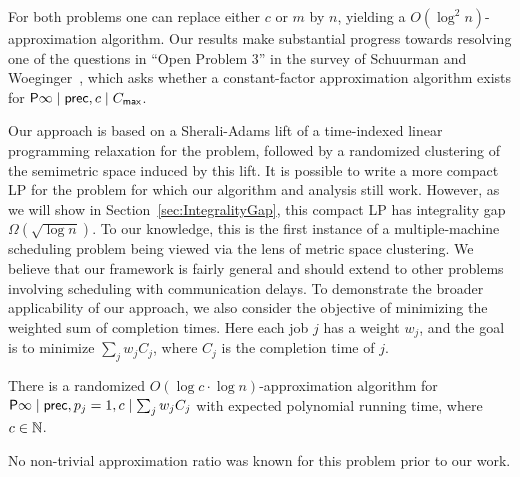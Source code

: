 For both problems one can replace either $c$ or $m$ by $n$, yielding a $O(\log^2 n)$-approximation algorithm.
Our results make substantial progress towards resolving  one of the questions in ``Open Problem 3'' in the survey of Schuurman and Woeginger~\cite{SW99a}, which asks whether a constant-factor approximation algorithm exists for $\mathsf{P} \infty \mid \mathsf{prec}, c \mid C_{\mathsf{max}}$.

Our approach is based on a Sherali-Adams lift of a time-indexed linear programming relaxation for the problem, followed by a randomized clustering of the semimetric space induced by this lift.
It is possible to write a more compact LP for the problem for which our algorithm and analysis still work. 
However, as we will show in Section~\ref{sec:IntegralityGap}, this compact LP has integrality gap $ \Omega(\sqrt{\log n})$.
To our knowledge, this is the first instance of a multiple-machine scheduling problem being viewed via the lens of metric space clustering.
We believe that our framework is fairly general and should extend to other problems involving scheduling with communication delays.
To demonstrate the broader applicability of our approach, we also consider the objective of minimizing the weighted sum of completion times. Here each job $j$ has a weight $w_j$, and the goal is to minimize $\sum_{j} w_j C_j$, where $C_j$ is the completion time of $j$.  

\begin{theorem} \label{thm:maincomp_sched1}
There is a randomized $O(\log c \cdot \log n)$-approximation algorithm for  $\mathsf{P} \infty \mid \mathsf{prec}, p_j = 1, c \mid \sum_{j} w_j C_j$ with expected polynomial running time, where $c \in \mathbb{N}$.
\end{theorem}

No non-trivial approximation ratio was known for this problem prior to our work. 



